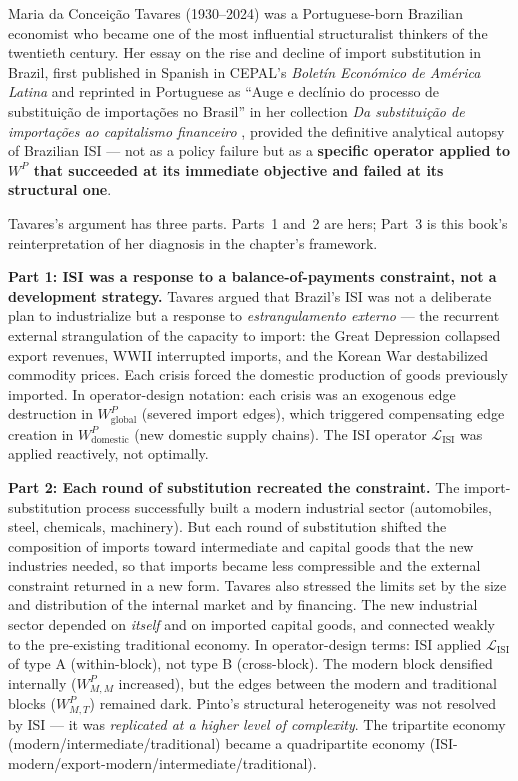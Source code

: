 \documentclass[../structural_economics_book.tex]{subfiles}
\begin{document}
Maria da Concei\c{c}\~{a}o Tavares (1930--2024) was a Portuguese-born Brazilian economist who became one of the most influential structuralist thinkers of the twentieth century. Her essay on the rise and decline of import substitution in Brazil, first published in Spanish in CEPAL's \textit{Bolet\'{i}n Econ\'{o}mico de Am\'{e}rica Latina} \citeyearpar{tavares1964auge} and reprinted in Portuguese as ``Auge e decl\'{i}nio do processo de substitui\c{c}\~{a}o de importa\c{c}\~{o}es no Brasil'' in her collection \textit{Da substitui\c{c}\~{a}o de importa\c{c}\~{o}es ao capitalismo financeiro} \citeyearpar{tavares1972substituicao}, provided the definitive analytical autopsy of Brazilian ISI --- not as a policy failure but as a \textbf{specific operator applied to $W^P$ that succeeded at its immediate objective and failed at its structural one}.

Tavares's argument has three parts. Parts~1 and~2 are hers; Part~3 is this book's reinterpretation of her diagnosis in the chapter's framework.

\textbf{Part 1: ISI was a response to a balance-of-payments constraint, not a development strategy.} Tavares argued that Brazil's ISI was not a deliberate plan to industrialize but a response to \emph{estrangulamento externo} --- the recurrent external strangulation of the capacity to import: the Great Depression collapsed export revenues, WWII interrupted imports, and the Korean War destabilized commodity prices. Each crisis forced the domestic production of goods previously imported. In operator-design notation: each crisis was an exogenous edge destruction in $W^P_{\text{global}}$ (severed import edges), which triggered compensating edge creation in $W^P_{\text{domestic}}$ (new domestic supply chains). The ISI operator $\mathcal{L}_{\text{ISI}}$ was applied reactively, not optimally.

\textbf{Part 2: Each round of substitution recreated the constraint.} The import-substitution process successfully built a modern industrial sector (automobiles, steel, chemicals, machinery). But each round of substitution shifted the composition of imports toward intermediate and capital goods that the new industries needed, so that imports became less compressible and the external constraint returned in a new form. Tavares also stressed the limits set by the size and distribution of the internal market and by financing. The new industrial sector depended on \textit{itself} and on imported capital goods, and connected weakly to the pre-existing traditional economy. In operator-design terms: ISI applied $\mathcal{L}_{\text{ISI}}$ of type A (within-block), not type B (cross-block). The modern block densified internally ($W^P_{M,M}$ increased), but the edges between the modern and traditional blocks ($W^P_{M,T}$) remained dark. Pinto's structural heterogeneity was not resolved by ISI --- it was \textit{replicated at a higher level of complexity}. The tripartite economy (modern/intermediate/traditional) became a quadripartite economy (ISI-modern/export-modern/intermediate/traditional).
\end{document}

